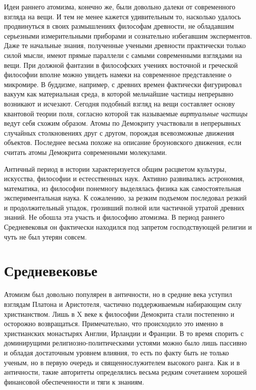 Идеи раннего атомизма, конечно же, были довольно далеки от современного взгляда на вещи.
И тем не менее кажется удивительным то, насколько удалось продвинуться в своих размышлениях философам древности, не обладавшим серьезными измерительными приборами и сознательно избегавшим эксперментов.
Даже те начальные знания, полученные учеными древности практически только силой мысли, имеют прямые параллели с самыми современными взглядами на вещи.
При должной фантазии в философских учениях восточной и греческой философии вполне можно увидеть намеки на современное представление о микромире.
В буддизме, например, с древних времен фактически фигурировал вакуум как материальная среда, в которой мельчайшие частицы непрерывно возникают и исчезают. 
Сегодня подобный взгляд на вещи составляет основу квантовой теории поля, согласно которой так называемые \textit{виртуальные частицы} ведут себя схожим образом. 
Атомы по Демокриту участвовали в непрерывных случайных столкновениях друг с другом, порождая всевозможные движения объектов. 
Последнее весьма похоже на описание броуновского движения, если считать атомы Демокрита современными молекулами.

Античный период в истории характеризуется общим расцветом культуры, искусства, философии и естесственных наук.
Активно развивались астрономия, математика, из философии понемногу выделялась физика как самостоятельная экспериментальная наука.
К сожалению, за резким подъемом последовал резкий и продолжительный упадок, грозивший полной или частичной утратой древних знаний.
Не обошла эта участь и философию атомизма.
В период раннего Средневековья он фактически находился под запретом господствующей религии и чуть не был утерян совсем.


\section*{Средневековье}

Атомизм был довольно популярен в античности, но в средние века уступил взглядам Платона и Аристотеля, частично поддерживаемым набирающим силу христианством.
Лишь в X веке к философии Демокрита стали постепенно и осторожно возвращаться.
Примечательно, что происходило это именно в христианских монастырях Англии, Ирландии и Франции.
В то время спорить с доминирущими религиозно-политическими устоями можно было лишь пассивно и обладая достаточным уровнем влияния, то есть по факту быть не только ученым, но в первую очередь и священнослужителем высокого ранга.
Как и в античности, такие авторитеты определялись весьма редким сочетанием хорошей финансовой обеспеченности и тяги к знаниям.


